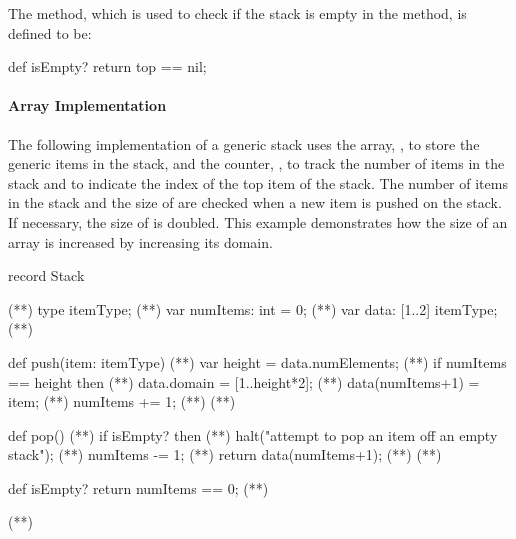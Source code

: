 The  method, which is used to check if the stack
is empty in the  method, is defined to be:
\begin{chapel}
  def isEmpty? return top == nil;   
\end{chapel}

\paragraph{Array Implementation}
The following implementation of a generic stack uses the array,
, to store the generic items in the stack, and the
counter, , to track the
number of items in the stack and to indicate the index of
the top item of the stack.  The number of items in the stack
and the size of  are checked when a new item is pushed
on the stack.  If necessary, the size of  is doubled.
This example demonstrates how the size of an array is increased 
by increasing its domain.

\begin{numberedchapel}
record Stack {                     (*\label{stack_array_start}*)
  type itemType;                   (*\label{stack_array_itemtype}*)
  var numItems: int = 0;           (*\label{stack_array_numitems}*)
  var data: [1..2] itemType;       (*\label{stack_array_data}*)

  def push(item: itemType) {       (*\label{stack_array_push_start}*)
    var height = data.numElements;  (*\label{stack_array_push_height}*)
    if numItems == height then      (*\label{stack_array_push_check_height}*)
      data.domain = [1..height*2];  (*\label{stack_array_push_incr_dom}*)
    data(numItems+1) = item;        (*\label{stack_array_push_new_item}*)
    numItems += 1;                  (*\label{stack_array_push_num_incr}*)
  }                                 (*\label{stack_array_push_end}*)

  def pop() {                       (*\label{stack_array_pop_start}*)
    if isEmpty? then                (*\label{stack_array_pop_empty_1}*)
      halt("attempt to pop an item off an empty stack"); (*\label{stack_array_pop_empty_2}*)
    numItems -= 1;                  (*\label{stack_array_pop_num_dec}*)
    return data(numItems+1);        (*\label{stack_array_pop_return}*)
  }                                 (*\label{stack_array_pop_end}*)

  def isEmpty? return numItems == 0; (*\label{stack_array_isempty}*)
}                                   (*\label{stack_array_end}*)
\end{numberedchapel}

